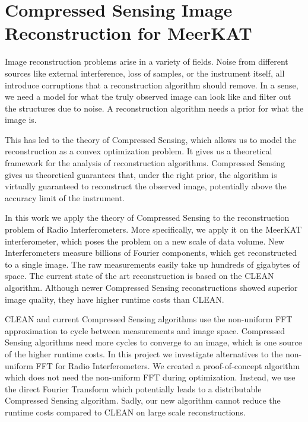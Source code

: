 \section{Compressed Sensing Image Reconstruction for MeerKAT} \label{intro}
Image reconstruction problems arise in a variety of fields. Noise from different sources like external interference, loss of samples, or the instrument itself, all introduce corruptions that a reconstruction algorithm should remove. In a sense, we need a model for what the truly observed image can look like and filter out the structures due to noise. A reconstruction algorithm needs a prior for what the image is. 

This has led to the theory of Compressed Sensing\cite{candes2006robust, donoho2006compressed}, which allows us to model the reconstruction as a convex optimization problem. It gives us a theoretical framework for the analysis of reconstruction algorithms. Compressed Sensing gives us theoretical guarantees that, under the right prior, the algorithm is virtually guaranteed to reconstruct the observed image, potentially above the accuracy limit of the instrument.

In this work we apply the theory of Compressed Sensing to the reconstruction problem of Radio Interferometers. More specifically, we apply it on the MeerKAT interferometer, which poses the problem on a new scale of data volume. New Interferometers measure billions of Fourier components, which get reconstructed to a single image. The raw measurements easily take up hundreds of gigabytes of space. The current state of the art reconstruction is based on the CLEAN\cite{rich2008multi, rau2011multi} algorithm. Although newer Compressed Sensing reconstructions showed superior image quality\cite{girard2015sparse, dabbech2018cygnus}, they have higher runtime costs than CLEAN.

CLEAN and current Compressed Sensing algorithms use the non-uniform FFT approximation\cite{kunisnonequispaced, pratley2017robust} to cycle between measurements and image space. Compressed Sensing algorithms need more cycles to converge to an image, which is one source of the higher runtime costs. In this project we investigate alternatives to the non-uniform FFT for Radio Interferometers. We created a proof-of-concept algorithm which does not need the non-uniform FFT during optimization. Instead, we use the direct Fourier Transform which potentially leads to a distributable Compressed Sensing algorithm. Sadly, our new algorithm cannot reduce the runtime costs compared to CLEAN on large scale reconstructions. 

